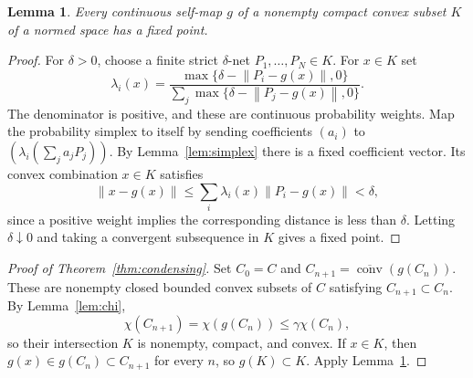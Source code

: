 \documentclass[11pt]{article}
\newtheorem{lemma}[theorem]{Lemma}
\theoremstyle{remark}
\newcommand{\norm}[1]{\left\lVert#1\right\rVert}
\newcommand{\clco}{\overline{\operatorname{conv}}}
\begin{document}
\begin{lemma}\label{lem:compactfixed}
Every continuous self-map $g$ of a nonempty compact convex subset $K$ of a normed space has a fixed point.
\end{lemma}
\begin{proof}
For $\delta>0$, choose a finite strict $\delta$-net $P_1,\ldots,P_N\in K$. For $x\in K$ set
\[
\lambda_i(x)=
\frac{\max\{\delta-\norm{P_i-g(x)},0\}}
 {\sum_j\max\{\delta-\norm{P_j-g(x)},0\}}.
\]
The denominator is positive, and these are continuous probability weights. Map the probability simplex to itself by sending coefficients $(a_i)$ to $(\lambda_i(\sum_j a_jP_j))$. By Lemma~\ref{lem:simplex} there is a fixed coefficient vector. Its convex combination $x\in K$ satisfies
\[
\norm{x-g(x)}
\le\sum_i\lambda_i(x)\norm{P_i-g(x)}<\delta,
\]
since a positive weight implies the corresponding distance is less than $\delta$. Letting $\delta\downarrow0$ and taking a convergent subsequence in $K$ gives a fixed point.
\end{proof}

\begin{proof}[Proof of Theorem~\ref{thm:condensing}]
Set $C_0=C$ and $C_{n+1}=\clco(g(C_n))$. These are nonempty closed bounded convex subsets of $C$ satisfying $C_{n+1}\subset C_n$. By Lemma~\ref{lem:chi},
\[
\chi(C_{n+1})=\chi(g(C_n))\le\gamma\chi(C_n),
\]
so their intersection $K$ is nonempty, compact, and convex. If $x\in K$, then $g(x)\in g(C_n)\subset C_{n+1}$ for every $n$, so $g(K)\subset K$. Apply Lemma~\ref{lem:compactfixed}.
\end{proof}


\end{document}
